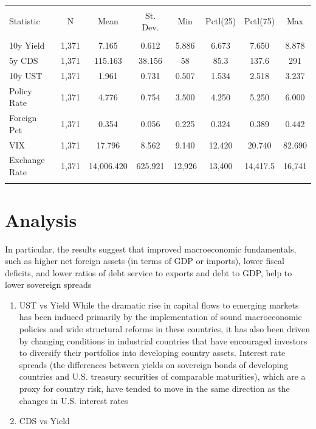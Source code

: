 \documentclass[11pt,a4paper,]{article}
\begin{document}
\begin{table}[!htbp] \centering 
  \caption{} 
  \label{tab:table1} 
\begin{tabular}{@{\extracolsep{5pt}}lccccccc} 
\\[-1.8ex]\hline 
\hline \\[-1.8ex] 
Statistic & \multicolumn{1}{c}{N} & \multicolumn{1}{c}{Mean} & \multicolumn{1}{c}{St. Dev.} & \multicolumn{1}{c}{Min} & \multicolumn{1}{c}{Pctl(25)} & \multicolumn{1}{c}{Pctl(75)} & \multicolumn{1}{c}{Max} \\ 
\hline \\[-1.8ex] 
10y Yield & 1,371 & 7.165 & 0.612 & 5.886 & 6.673 & 7.650 & 8.878 \\ 
5y CDS & 1,371 & 115.163 & 38.156 & 58 & 85.3 & 137.6 & 291 \\ 
10y UST & 1,371 & 1.961 & 0.731 & 0.507 & 1.534 & 2.518 & 3.237 \\ 
Policy Rate & 1,371 & 4.776 & 0.754 & 3.500 & 4.250 & 5.250 & 6.000 \\ 
Foreign Pct & 1,371 & 0.354 & 0.056 & 0.225 & 0.324 & 0.389 & 0.442 \\ 
VIX & 1,371 & 17.796 & 8.562 & 9.140 & 12.420 & 20.740 & 82.690 \\ 
Exchange Rate & 1,371 & 14,006.420 & 625.921 & 12,926 & 13,400 & 14,417.5 & 16,741 \\ 
\hline \\[-1.8ex] 
\end{tabular} 
\end{table}

\hypertarget{analysis}{%
\section{Analysis}\label{analysis}}

In particular, the results suggest that
improved macroeconomic fundamentals, such as higher net foreign assets (in
terms of GDP or imports), lower fiscal deficits, and lower ratios of debt service to
exports and debt to GDP, help to lower sovereign spreads \textcite{arora}

\begin{enumerate}
\def\labelenumi{\alph{enumi}.}
\item
  UST vs Yield
  While the dramatic rise in capital flows to
  emerging markets has been induced primarily by the implementation of sound
  macroeconomic policies and wide structural reforms in these countries, it has
  also been driven by changing conditions in industrial countries that have
  encouraged investors to diversify their portfolios into developing country
  assets. Interest rate spreads (the differences between yields on
  sovereign bonds of developing countries and U.S. treasury securities of
  comparable maturities), which are a proxy for country risk, have tended to
  move in the same direction as the changes in U.S. interest rates \textcite{arora}
\item
  CDS vs Yield
\end{enumerate}
\end{document}
